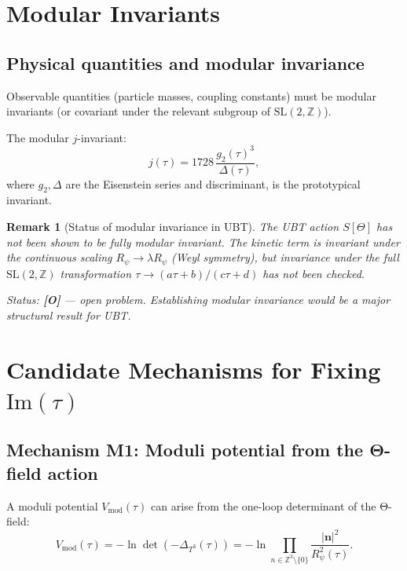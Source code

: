 \documentclass[11pt,a4paper]{article}
\newtheorem{remark}{Remark}
\begin{document}
\section{Modular Invariants}
\label{sec:modular_inv}

\subsection{Physical quantities and modular invariance}

Observable quantities (particle masses, coupling constants) must be
modular invariants (or covariant under the relevant subgroup of
$\mathrm{SL}(2,\mathbb{Z})$).

The modular $j$-invariant:
\begin{equation}
\label{eq:j_inv}
  j(\tau) = 1728\, \frac{g_2(\tau)^3}{\Delta(\tau)},
\end{equation}
where $g_2, \Delta$ are the Eisenstein series and discriminant, is the
prototypical invariant.

\begin{remark}[Status of modular invariance in UBT]
  The UBT action $S[\Theta]$ has not been shown to be fully modular invariant.
  The kinetic term is invariant under the continuous scaling $R_\psi \to \lambda R_\psi$
  (Weyl symmetry), but invariance under the full $\mathrm{SL}(2,\mathbb{Z})$
  transformation $\tau \to (a\tau+b)/(c\tau+d)$ has not been checked.

  Status: \textbf{[O]} — open problem.  Establishing modular invariance
  would be a major structural result for UBT.
\end{remark}

\section{Candidate Mechanisms for Fixing \texorpdfstring{$\mathrm{Im}(\tau)$}{Im(tau)}}
\label{sec:fix_tau}

\subsection{Mechanism M1: Moduli potential from the Θ-field action}

A moduli potential $V_{\mathrm{mod}}(\tau)$ can arise from the one-loop
determinant of the Θ-field:
\begin{equation}
\label{eq:moduli_potential}
  V_{\mathrm{mod}}(\tau)
  = -\ln\det(-\Delta_{T^3}(\tau))
  = -\ln\prod_{n\in\mathbb{Z}^3\setminus\{0\}}
    \frac{|\mathbf{n}|^2}{R_\psi^2(\tau)}.
\end{equation}
\end{document}
